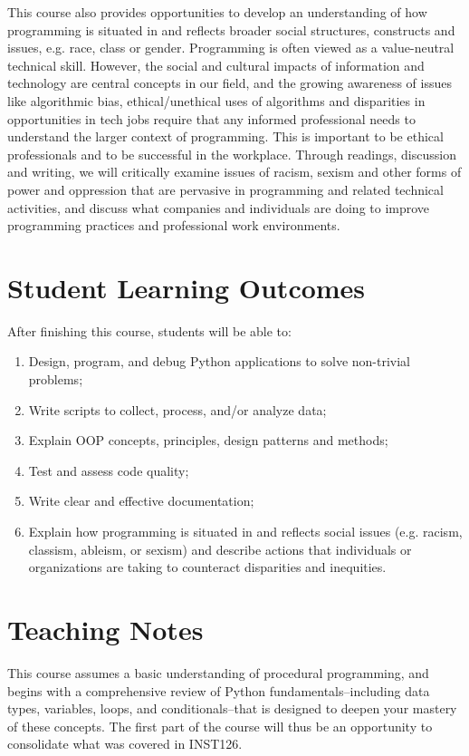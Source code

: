 \documentclass[11pt]{article}
\begin{document}
This course also provides opportunities to develop an understanding of how programming is situated in and reflects broader social structures, constructs and issues, e.g. race, class or gender. Programming is often viewed as a value-neutral technical skill. However, the social and cultural impacts of information and technology are central concepts in our field, and the growing awareness of issues like algorithmic bias, ethical/unethical uses of algorithms and disparities in opportunities in tech jobs require that  any informed professional needs to understand the larger context of programming. This is important to be ethical professionals and to be successful in the workplace. Through readings, discussion and writing, we will critically examine issues of racism, sexism and other forms of power and oppression that are pervasive in programming and related technical activities, and discuss what companies and individuals are doing to improve programming practices and professional work environments.

\section{Student Learning Outcomes}
After finishing this course, students will be able to:
\begin{enumerate}
	\item Design, program, and debug Python applications to solve non-trivial problems;
	\item Write scripts to collect, process, and/or analyze data;
	\item Explain OOP concepts, principles, design patterns and methods;
	\item Test and assess code quality;
	\item Write clear and effective documentation;
	\item Explain how programming is situated in and reflects social issues (e.g. racism, classism, ableism, or sexism) and describe actions that individuals or organizations are taking to counteract disparities and inequities.
\end{enumerate}

\section{Teaching Notes}
This course assumes a basic understanding of procedural programming, and begins with a comprehensive review of Python fundamentals--including data types, variables, loops, and conditionals--that is designed to deepen your mastery of these concepts. The first part of the course will thus be an opportunity to consolidate what was covered in INST126.
\end{document}
